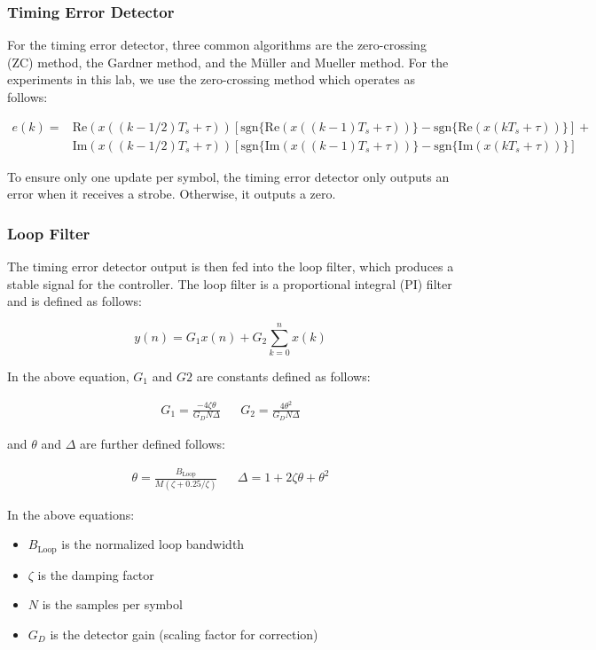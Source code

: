 \documentclass{article}
\begin{document}
\subsubsection{Timing Error Detector}
For the timing error detector, three common algorithms are the zero-crossing (ZC) method, the Gardner method, and the M\"{u}ller and Mueller method. For the experiments in this lab, we use the zero-crossing method which operates as follows:

\begin{align}
	e(k) = &\text{Re}(x((k-1/2)T_s + \tau))\left[\text{sgn}\{\text{Re}(x((k-1)T_s+\tau))\} - \text{sgn}\{\text{Re}(x(kT_s+\tau))\}\right] + \\
	&\text{Im}(x((k-1/2)T_s + \tau))\left[\text{sgn}\{\text{Im}(x((k-1)T_s+\tau))\} - \text{sgn}\{\text{Im}(x(kT_s+\tau))\}\right]
\end{align}

\noindent To ensure only one update per symbol, the timing error detector only outputs an error when it receives a strobe. Otherwise, it outputs a zero.

\subsubsection{Loop Filter}
The timing error detector output is then fed into the loop filter, which produces a stable signal for the controller. The loop filter is a proportional integral (PI) filter and is defined as follows:

\begin{equation}
	y(n) = G_1x(n) + G_2\sum_{k=0}^{n}{x(k)}
\end{equation}

\noindent In the above equation, $G_1$ and $G2$ are constants defined as follows:

\begin{align}
	G_1 = \frac{-4\zeta\theta}{G_DN\Delta} && G_2 = \frac{4\theta^2}{G_DN\Delta}
\end{align}

\noindent and $\theta$ and $\Delta$ are further defined follows:

\begin{align}
	\theta = \frac{B_{\text{Loop}}}{M(\zeta + 0.25/\zeta)} && \Delta = 1 + 2\zeta\theta + \theta^2
\end{align}

\noindent In the above equations:

\begin{itemize}
	\item $B_{\text{Loop}}$ is the normalized loop bandwidth
	\item $\zeta$ is the damping factor
	\item $N$ is the samples per symbol
	\item $G_D$ is the detector gain (scaling factor for correction)
\end{itemize}
\end{document}
